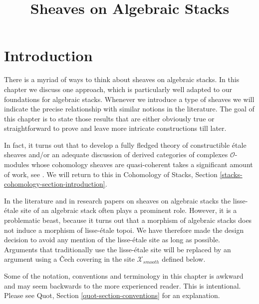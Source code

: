 \documentclass{stacks-project}
\theoremstyle{plain}
\theoremstyle{definition}
\theoremstyle{remark}
\numberwithin{equation}{subsection}
\begin{document}
\title{Sheaves on Algebraic Stacks}


\maketitle

\label{section-phantom}

\tableofcontents

\section{Introduction}
\label{section-introduction}

\noindent
There is a myriad of ways to think about sheaves on algebraic stacks.
In this chapter we discuss one approach, which is particularly well
adapted to our foundations for algebraic stacks. Whenever we introduce
a type of sheaves we will indicate the precise relationship with
similar notions in the literature.
The goal of this chapter is to state those results
that are either obviously true or straightforward to prove
and leave more intricate constructions till later.

\medskip\noindent
In fact, it turns out that to develop a fully fledged theory of
constructible \'etale sheaves and/or an adequate discussion of
derived categories of complexes $\mathcal{O}$-modules whose
cohomology sheaves are quasi-coherent takes a significant amount of work, see
\cite{olsson_sheaves}. We will return to this in
Cohomology of Stacks, Section \ref{stacks-cohomology-section-introduction}.

\medskip\noindent
In the literature and in research papers on sheaves on algebraic stacks
the lisse-\'etale site of an algebraic stack often plays a prominent role.
However, it is a problematic beast, because it turns out that a morphism of
algebraic stacks does not induce a morphism of lisse-\'etale topoi. We have
therefore made the design decision to avoid any mention of the lisse-\'etale
site as long as possible. Arguments that traditionally use the lisse-\'etale
site will be replaced by an argument using a {\v C}ech covering
in the site $\mathcal{X}_{smooth}$ defined below.

\medskip\noindent
Some of the notation, conventions and terminology in this chapter is awkward
and may seem backwards to the more experienced reader. This is intentional.
Please see Quot, Section \ref{quot-section-conventions} for an
explanation.
\end{document}
